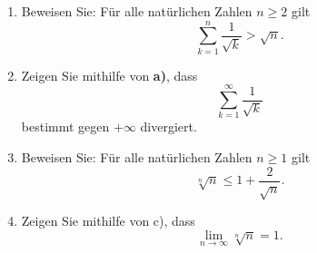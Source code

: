 \documentclass{../problemset}
\author{Michael van Straten}
\begin{document}
\maketitle

\begin{problem}
\begin{enumerate}
	\item Beweisen Sie: Für alle natürlichen Zahlen $n \geq 2$ gilt
	      \[
		      \sum_{k=1}^{n} \frac{1}{\sqrt{k}} > \sqrt{n}.
	      \]

	\item Zeigen Sie mithilfe von \textbf{a)}, dass \[
		      \sum_{k=1}^{\infty} \frac{1}{\sqrt{k}}
	      \] bestimmt gegen $+\infty$ divergiert.

	\item Beweisen Sie: Für alle natürlichen Zahlen $n \geq 1$ gilt
	      \[
		      \sqrt[n]{n} \leq 1 + \frac{2}{\sqrt{n}}.
	      \]

	\item Zeigen Sie mithilfe von c), dass
	      \[
		      \lim_{{n\to\infty}} \sqrt[n]{n} = 1.
	      \]
\end{enumerate}


\end{problem}
\end{document}
